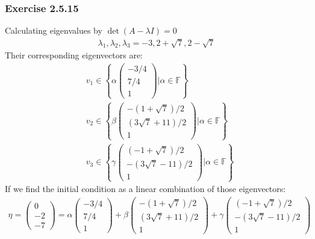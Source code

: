 \documentclass[12pt, letterpaper]{scrartcl}
\newcommand{\F}{\mathbb{F}}
\begin{document}
\subsubsection*{Exercise 2.5.15}
Calculating eigenvalues by $\det (A-\lambda I)=0$
\begin{align*}
    \lambda_1, \lambda_2, \lambda_3=-3, 2+\sqrt{7}, 2-\sqrt{7}
\end{align*}
Their corresponding eigenvectors are:
\begin{align*}
    &v_1\in\left\{\alpha\left(\begin{array}{c} -3/4 \\ 7/4 \\ 1 \end{array}\right) | \alpha\in\F\right\}\\
    &v_2\in\left\{\beta\left(\begin{array}{c} -(1+\sqrt{7})/2 \\ (3\sqrt{7}+11)/2 \\ 1 \end{array}\right) | \alpha\in\F\right\}\\
    &v_3\in\left\{\gamma\left(\begin{array}{c} (-1+\sqrt{7})/2 \\ -(3\sqrt{7}-11)/2 \\ 1 \end{array}\right) | \alpha\in\F\right\}
\end{align*}
If we find the initial condition as a linear combination of those eigenvectors:
\begin{align*}
    \eta=
    \left(\begin{array}{c} 0 \\ -2 \\ -7 \end{array}\right)
    =
    \alpha\left(\begin{array}{c} -3/4 \\ 7/4 \\ 1 \end{array}\right)
    +
    \beta\left(\begin{array}{c} -(1+\sqrt{7})/2 \\ (3\sqrt{7}+11)/2 \\ 1 \end{array}\right)
    +
    \gamma\left(\begin{array}{c} (-1+\sqrt{7})/2 \\ -(3\sqrt{7}-11)/2 \\ 1 \end{array}\right)
\end{align*}
\end{document}
